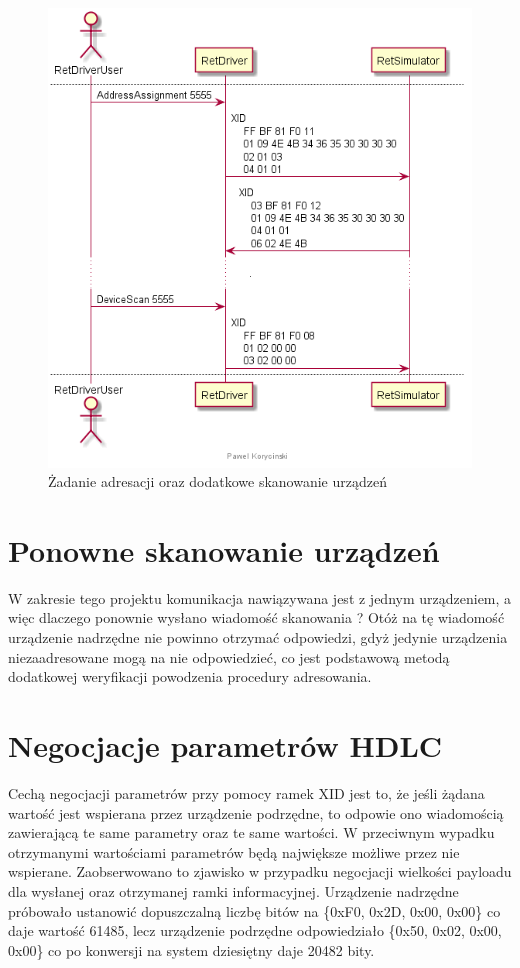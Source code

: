     \begin{figure}[h!]
    \centering
    \includegraphics[scale=0.75]{out/Diagramy/UML_DiagramOfSequence_New/KalibracjaRETa-page2.png}
    \caption{Żadanie adresacji oraz dodatkowe skanowanie urządzeń}
    \end{figure}

    \section{Ponowne skanowanie urządzeń}
    W zakresie tego projektu komunikacja nawiązywana jest z jednym urządzeniem, a więc dlaczego
    ponownie wysłano wiadomość skanowania ? Otóż na tę wiadomość urządzenie nadrzędne
    nie powinno otrzymać odpowiedzi, gdyż jedynie urządzenia niezaadresowane mogą na nie 
    odpowiedzieć, co jest podstawową metodą dodatkowej weryfikacji powodzenia procedury
    adresowania.

    \section{Negocjacje parametrów HDLC}
    Cechą negocjacji parametrów przy pomocy ramek XID jest to, że jeśli żądana wartość jest wspierana przez
    urządzenie podrzędne, to odpowie ono wiadomością zawierającą te same parametry oraz te same wartości. 
    W przeciwnym wypadku otrzymanymi wartościami parametrów będą największe możliwe przez nie wspierane.
    Zaobserwowano to zjawisko w przypadku negocjacji wielkości payloadu dla wysłanej oraz otrzymanej ramki informacyjnej.
    Urządzenie nadrzędne próbowało ustanowić dopuszczalną liczbę bitów na \{0xF0, 0x2D, 0x00, 0x00\} co daje wartość 61485,
    lecz urządzenie podrzędne odpowiedziało \{0x50, 0x02, 0x00, 0x00\} co po konwersji na system dziesiętny daje 20482 bity.

